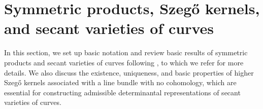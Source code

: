 \documentclass[12pt]{amsart}
\numberwithin{equation}{section}
\numberwithin{thmcounter}{section}
\theoremstyle{definition}
\theoremstyle{claim}
\begin{document}
\section{Symmetric products, Szeg\H{o} kernels, and secant varieties of curves}\label{sec:prelimsymmsec}
\noindent In this section, we set up basic notation and review basic results of symmetric products and secant varieties of curves following  \cite{agostini, ENP, ENP3, NP}, to which we refer  for more details. We also discuss the existence, uniqueness, and basic properties of higher Szeg\H{o} kernels associated with a line bundle with no cohomology, which are essential for constructing admissible determinantal representations of secant varieties of curves.
\end{document}
